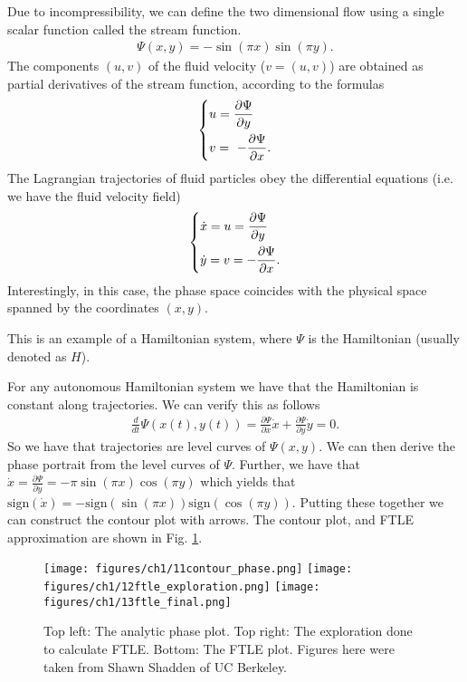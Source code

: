\begin{ex}
	Due to incompressibility, we can define the two dimensional flow using a single scalar function called the stream function.
\begin{align}
	\Psi(x,y) = -\sin(\pi x) \sin(\pi y).
\end{align}
	The components $(u,v)$ of the fluid velocity (${v} = (u,v)$) are obtained as partial derivatives of the stream function, according to the formulas
	\begin{align}
		\begin{dcases}
			u = \frac{\partial \Psi}{\partial y} \\ 
			v = \ - \frac{\partial \Psi}{\partial x}.
		\end{dcases}
	\end{align}
The Lagrangian trajectories of fluid particles obey the differential equations (i.e. we have the fluid velocity field)
\begin{align} 
	\begin{dcases}
		\dot{x} = u =  \frac{\partial \Psi}{\partial y} \\
		\dot{y} = v = - \frac{\partial \Psi}{\partial x}.
	\end{dcases}
\end{align}
Interestingly, in this case, the phase space coincides with the physical space spanned by the coordinates $(x,y)$.
\begin{remark}[]
	This is an example of a Hamiltonian system, where $\Psi$ is the Hamiltonian (usually denoted as $H$).
\end{remark}
For any autonomous Hamiltonian system we have that the Hamiltonian is constant along trajectories. We can verify this as follows
\begin{align}
	\frac{d}{dt}\Psi(x(t),y(t)) = \frac{\partial \Psi}{\partial x}\dot{x} + \frac{\partial \Psi}{\partial y}\dot{y} = 0.
\end{align}
So we have that trajectories are level curves of $\Psi(x,y)$. We can then derive the phase portrait from the level curves of $\Psi$. Further, we have that $\dot{x} = \frac{\partial \Psi}{\partial y} = - \pi \sin(\pi x) \cos(\pi y)$ which yields that $ \textrm{sign} (\dot{x}) = -  \textrm{sign} (\sin(\pi x))  \textrm{sign} (\cos(\pi y))$. Putting these together we can construct the contour plot with arrows. The contour plot, and FTLE approximation are shown in Fig. \ref{fig:FTLE_double_gyre}.

\begin{figure}[h!]
	\centering
	\texttt{[image: figures/ch1/11contour\_phase.png]}
	\hspace{0.03\textwidth}
	\texttt{[image: figures/ch1/12ftle\_exploration.png]}
	\texttt{[image: figures/ch1/13ftle\_final.png]}
	\caption{Top left: The analytic phase plot. Top right: The exploration done to calculate FTLE. Bottom: The FTLE plot. Figures here were taken from Shawn Shadden of UC Berkeley.} \label{fig:FTLE_double_gyre}
\end{figure}
\end{ex}
